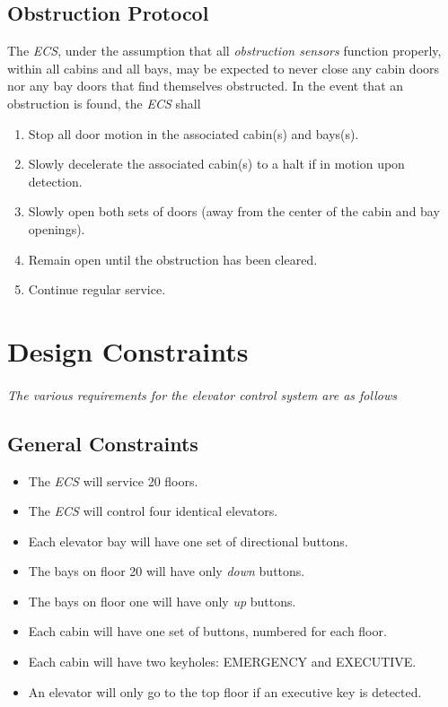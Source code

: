 \documentclass[12pt]{article}
\begin{document}
\subsection{Obstruction Protocol} The \textit{ECS}, under the assumption that all \textit{obstruction sensors} function properly, within all cabins and all bays, may be expected to never close any cabin doors nor any bay doors that find themselves obstructed. In the event that an obstruction is found, the \textit{ECS} shall
\begin{enumerate}
\item Stop all door motion in the associated cabin(s) and bays(s).
\item Slowly decelerate the associated cabin(s) to a halt if in motion upon detection.
\item Slowly open both sets of doors (away from the center of the cabin and bay openings).
\item Remain open until the obstruction has been cleared.
\item Continue regular service.
\end{enumerate}

\pagebreak
\section{Design Constraints} %
\label{con}
\paragraph{} \textit{The various requirements for the elevator control system are as follows}
\subsection{General Constraints}
\begin{itemize}
	\item The \textit{ECS} will service 20 floors.
	\item The \textit{ECS} will control four identical elevators.
	\item Each elevator bay will have one set of directional buttons.
	\item The bays on floor 20 will have only \textit{down} buttons.
	\item The bays on floor one will have only \textit{up} buttons.
	\item Each cabin will have one set of buttons, numbered for each floor.
	\item Each cabin will have two keyholes: EMERGENCY and EXECUTIVE.
	\item An elevator will only go to the top floor if an executive key is detected.	
\end{itemize}
\end{document}
